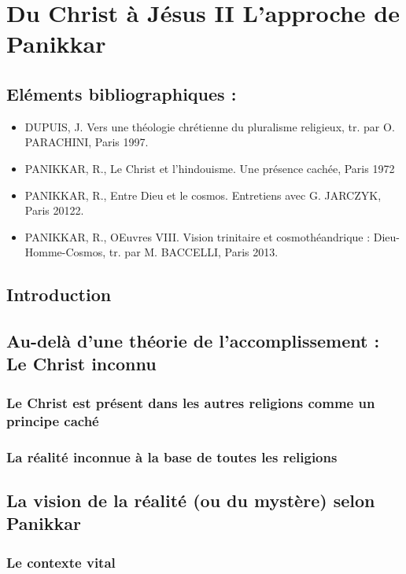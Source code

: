 \chapter{Du Christ à Jésus II
L’approche de Panikkar
}


\section{Eléments bibliographiques :}

\begin{itemize}
    \item DUPUIS, J. Vers une théologie chrétienne du
pluralisme religieux, tr. par O. PARACHINI,
Paris 1997.
    \item PANIKKAR, R., Le Christ et l’hindouisme. Une présence cachée, Paris 1972
    \item PANIKKAR, R., Entre Dieu et le cosmos. Entretiens avec G. JARCZYK, Paris 20122.
    \item PANIKKAR, R., OEuvres VIII. Vision trinitaire et cosmothéandrique : Dieu-Homme-Cosmos, tr.
par M. BACCELLI, Paris 2013.
\end{itemize}

\section{Introduction}

\section{Au-delà d’une théorie de l’accomplissement : Le Christ inconnu
}

\subsection{Le Christ est présent dans les autres religions comme un principe caché}
 
\subsection{La réalité inconnue à la base de toutes les religions} 

\section{La vision de la réalité (ou du mystère) selon Panikkar}
\subsection{Le contexte vital}
 
